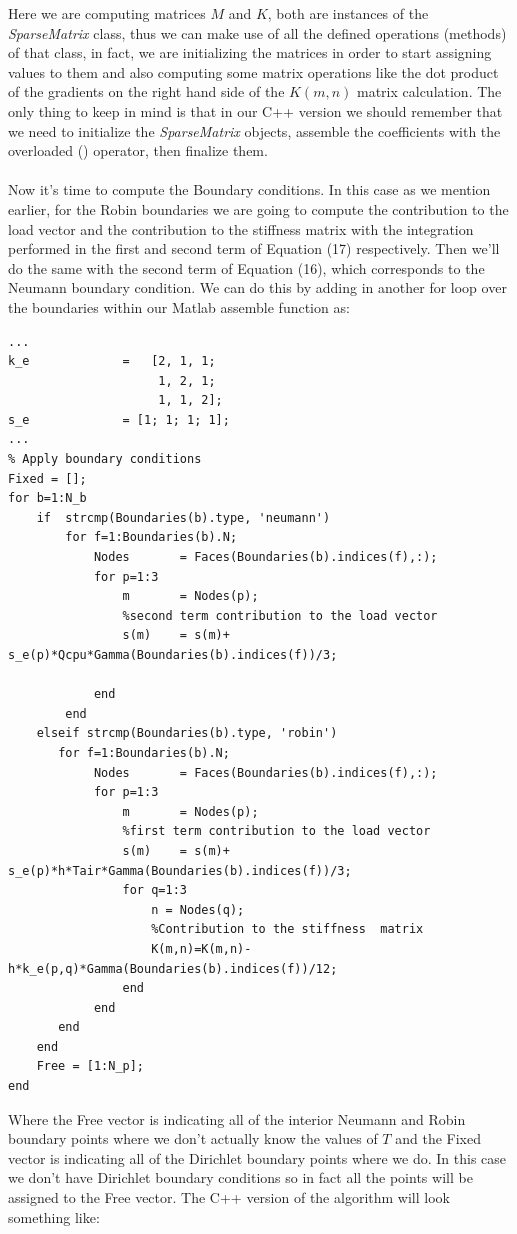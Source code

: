\documentclass[12pt]{article}
\begin{document}
Here we are computing matrices $M$ and $K$, both are instances of the \textit{SparseMatrix} class, thus we can make use of all the defined operations (methods) of that class, in fact, we are initializing the matrices in order to start assigning values to them and also computing some matrix operations like the dot product of the gradients on the right hand side of the $K(m,n)$ matrix calculation. The only thing to keep in mind is that in our C++ version we should remember that we need to initialize the \textit{SparseMatrix} objects, assemble the coefficients with the overloaded () operator, then finalize them.
\\\\
Now it's time to compute the Boundary conditions. In this case as we mention earlier, for the Robin boundaries we are going to compute the contribution to the load vector and the contribution to the stiffness matrix with the integration performed in the first and second term of Equation (17) respectively. Then we'll do the same with the second term of Equation (16), which corresponds to the Neumann boundary condition. We can do this by adding in another for loop over the boundaries within our Matlab assemble function as:

\begin{lstlisting}
...
k_e             =   [2, 1, 1; 
                     1, 2, 1;
                     1, 1, 2];                   
s_e             = [1; 1; 1; 1];
...
% Apply boundary conditions
Fixed = [];
for b=1:N_b  
	if  strcmp(Boundaries(b).type, 'neumann')
		for f=1:Boundaries(b).N;
			Nodes       = Faces(Boundaries(b).indices(f),:);
			for p=1:3
				m     	= Nodes(p);
				%second term contribution to the load vector
				s(m)	= s(m)+ s_e(p)*Qcpu*Gamma(Boundaries(b).indices(f))/3; 
				
			end
		end        
	elseif strcmp(Boundaries(b).type, 'robin')
	   for f=1:Boundaries(b).N;
			Nodes       = Faces(Boundaries(b).indices(f),:);
			for p=1:3
				m     	= Nodes(p);
				%first term contribution to the load vector
				s(m)	= s(m)+ s_e(p)*h*Tair*Gamma(Boundaries(b).indices(f))/3; 
				for q=1:3
					n = Nodes(q);
					%Contribution to the stiffness  matrix
					K(m,n)=K(m,n)-h*k_e(p,q)*Gamma(Boundaries(b).indices(f))/12; 
				end
			end
	   end
	end
	Free = [1:N_p];
end
\end{lstlisting}

Where the Free vector is indicating all of the interior Neumann and Robin boundary points where we don't actually know the values of $T$ and the Fixed vector is indicating all of the Dirichlet boundary points where we do. In this case we don't have Dirichlet boundary conditions so in fact all the points will be assigned to the Free vector. The C++ version of the algorithm will look something like:
\end{document}

